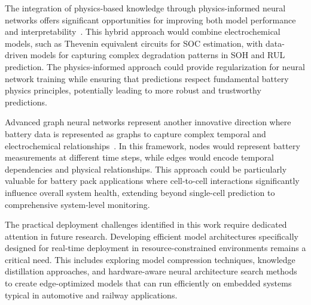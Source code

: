 The integration of physics-based knowledge through physics-informed neural networks offers significant opportunities for improving both model performance and interpretability~\cite{raissi_physics-informed_2019}. This hybrid approach would combine electrochemical models, such as Thevenin equivalent circuits for SOC estimation, with data-driven models for capturing complex degradation patterns in SOH and RUL prediction. The physics-informed approach could provide regularization for neural network training while ensuring that predictions respect fundamental battery physics principles, potentially leading to more robust and trustworthy predictions.

Advanced graph neural networks represent another innovative direction where battery data is represented as graphs to capture complex temporal and electrochemical relationships~\cite{zhou_graph_2020}. In this framework, nodes would represent battery measurements at different time steps, while edges would encode temporal dependencies and physical relationships. This approach could be particularly valuable for battery pack applications where cell-to-cell interactions significantly influence overall system health, extending beyond single-cell prediction to comprehensive system-level monitoring.

The practical deployment challenges identified in this work require dedicated attention in future research. Developing efficient model architectures specifically designed for real-time deployment in resource-constrained environments remains a critical need. This includes exploring model compression techniques, knowledge distillation approaches, and hardware-aware neural architecture search methods to create edge-optimized models that can run efficiently on embedded systems typical in automotive and railway applications.